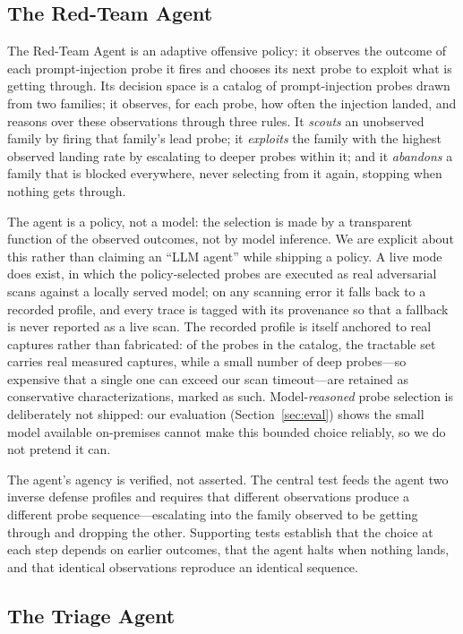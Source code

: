 \documentclass[10pt,twocolumn]{article}
\begin{document}
\subsection{The Red-Team Agent}

The Red-Team Agent is an adaptive offensive policy: it observes the outcome of
each prompt-injection probe it fires and chooses its next probe to exploit what
is getting through. Its decision space is a catalog of prompt-injection probes
drawn from two families; it observes, for each probe, how often the injection
landed, and reasons over these observations through three rules. It
\emph{scouts} an unobserved family by firing that family's lead probe; it
\emph{exploits} the family with the highest observed landing rate by escalating
to deeper probes within it; and it \emph{abandons} a family that is blocked
everywhere, never selecting from it again, stopping when nothing gets through.

The agent is a policy, not a model: the selection is made by a transparent
function of the observed outcomes, not by model inference. We are explicit about
this rather than claiming an ``LLM agent'' while shipping a policy. A live mode
does exist, in which the policy-selected probes are executed as real adversarial
scans against a locally served model; on any scanning error it falls back to a
recorded profile, and every trace is tagged with its provenance so that a
fallback is never reported as a live scan. The recorded profile is itself
anchored to real captures rather than fabricated: of the probes in the catalog,
the tractable set carries real measured captures, while a small number of deep
probes---so expensive that a single one can exceed our scan timeout---are
retained as conservative characterizations, marked as such. Model-\emph{reasoned}
probe selection is deliberately not shipped: our evaluation (Section~\ref{sec:eval}) shows the
small model available on-premises cannot make this bounded choice reliably, so we
do not pretend it can.

The agent's agency is verified, not asserted. The central test feeds the agent
two inverse defense profiles and requires that different observations produce a
different probe sequence---escalating into the family observed to be getting
through and dropping the other. Supporting tests establish that the choice at
each step depends on earlier outcomes, that the agent halts when nothing lands,
and that identical observations reproduce an identical sequence.

\subsection{The Triage Agent}
\end{document}
